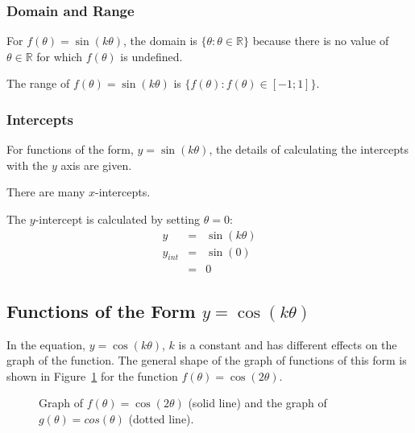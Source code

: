 \subsubsection{Domain and Range}
For $f(\theta)=\sin(k\theta)$, the domain is $\{\theta:\theta\in\mathbb{R}\}$ because there is no value of $\theta \in \mathbb{R}$ for which $f(\theta)$ is undefined.

The range of $f(\theta)=\sin (k\theta)$ is $\{f(\theta):f(\theta)\in[-1;1]\}$.

\subsubsection{Intercepts}
For functions of the form, $y=\sin(k\theta)$, the details of calculating the intercepts with the $y$ axis are given.

There are many $x$-intercepts. 

The $y$-intercept is calculated by setting $\theta=0$:
\begin{eqnarray*}
y&=&\sin(k\theta)\\
y_{int}&=&\sin(0)\\
&=&0
\end{eqnarray*}

\subsection{Functions of the Form $y=\cos(k\theta)$}
In the equation, $y=\cos(k\theta)$, $k$ is a constant and has different effects on the graph of the function. The general shape of the graph of functions of this form is shown in Figure~\ref{fig:m:t11:g:coskx} for the function $f(\theta)=\cos(2\theta)$.

\begin{figure}[!ht]
\begin{center}
\caption{Graph of $f(\theta)=\cos(2\theta)$ (solid line) and the graph of $g(\theta)=cos(\theta)$ (dotted line).}
\label{fig:m:t11:g:coskx}
\end{center}
\end{figure}

